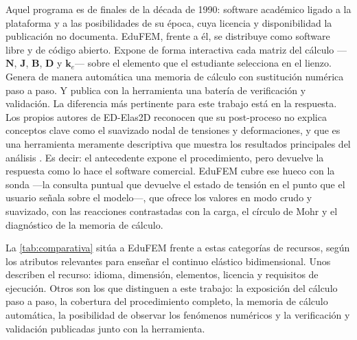 Aquel programa es de finales de la década de 1990: software académico ligado a la plataforma y a las posibilidades de su época, cuya licencia y disponibilidad la publicación no documenta. EduFEM, frente a él, se distribuye como software libre y de código abierto. Expone de forma interactiva cada matriz del cálculo —$\bm{N}$, $\bm{J}$, $\bm{B}$, $\bm{D}$ y $\bm{k}_e$— sobre el elemento que el estudiante selecciona en el lienzo. Genera de manera automática una memoria de cálculo con sustitución numérica paso a paso. Y publica con la herramienta una batería de verificación y validación. La diferencia más pertinente para este trabajo está en la respuesta. Los propios autores de ED-Elas2D reconocen que su post-proceso no explica conceptos clave como el suavizado nodal de tensiones y deformaciones, y que es una herramienta meramente descriptiva que muestra los resultados principales del análisis \autocite[p.~253]{suarez1998edelas2d}. Es decir: el antecedente expone el procedimiento, pero devuelve la respuesta como lo hace el software comercial. EduFEM cubre ese hueco con la sonda —la consulta puntual que devuelve el estado de tensión en el punto que el usuario señala sobre el modelo—, que ofrece los valores en modo crudo y suavizado, con las reacciones contrastadas con la carga, el círculo de Mohr y el diagnóstico de la memoria de cálculo.

La \autoref{tab:comparativa} sitúa a EduFEM frente a estas categorías de recursos, según los atributos relevantes para enseñar el continuo elástico bidimensional. Unos describen el recurso: idioma, dimensión, elementos, licencia y requisitos de ejecución. Otros son los que distinguen a este trabajo: la exposición del cálculo paso a paso, la cobertura del procedimiento completo, la memoria de cálculo automática, la posibilidad de observar los fenómenos numéricos y la verificación y validación publicadas junto con la herramienta.

